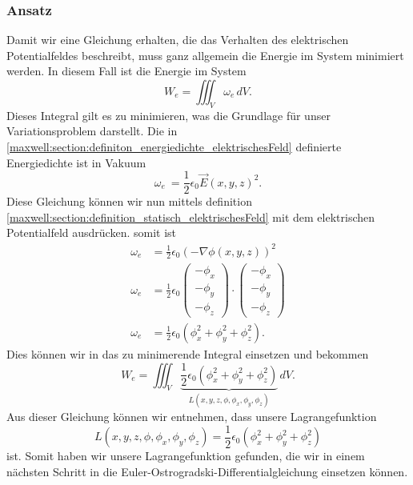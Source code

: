 \subsubsection{Ansatz}
Damit wir eine Gleichung erhalten, die das Verhalten des elektrischen Potentialfeldes beschreibt, muss ganz allgemein die Energie im System minimiert werden. 
In diesem Fall ist die Energie im System
\[
W_e
=
\iiint_V \omega_e\, dV.
\]
Dieses Integral gilt es zu minimieren, was die Grundlage für unser Variationsproblem darstellt.
Die in \eqref{maxwell:section:definiton_energiedichte_elektrischesFeld} definierte Energiedichte ist in Vakuum
\[
\omega_e\
=
\frac{1}{2}\epsilon_0\vec{E}(x,y,z)^2.
\]
Diese Gleichung können wir nun mittels definition \eqref{maxwell:section:definition_statisch_elektrischesFeld} mit dem elektrischen Potentialfeld ausdrücken.
somit ist
\begin{align}
\omega_e
&=
\frac{1}{2}\epsilon_0\left(-\nabla\phi(x,y,z)\right)^2
\\
\omega_e
&=
\frac{1}{2}\epsilon_0
\begin{pmatrix}
-\phi_x\\
-\phi_y\\
-\phi_z
\end{pmatrix}
\cdot
\begin{pmatrix}
-\phi_x\\
-\phi_y\\
-\phi_z
\end{pmatrix}
\\
\omega_e
&=
\frac{1}{2}\epsilon_0\left(\phi_x^2 + \phi_y^2 + \phi_z^2\right).
\label{maxwell:section:energiedichte}
\end{align}
Dies können wir in das zu minimerende Integral einsetzen und bekommen
\begin{equation}
	W_e
	=
	\iiint_V \underbrace{
		\frac{1}{2}\epsilon_0\left(\phi_x^2 + \phi_y^2 + \phi_z^2\right)}_{L(x,y,z,\phi,\phi_x,\phi_y,\phi_z)}\, dV.
	\label{maxwell:section:energieintegral_quellenfrei}
\end{equation}
Aus dieser Gleichung können wir entnehmen, dass unsere Lagrangefunktion
\begin{equation}
	L(x,y,z,\phi,\phi_x,\phi_y,\phi_z)
	=
	\frac{1}{2}\epsilon_0\left(\phi_x^2 + \phi_y^2 + \phi_z^2\right)
	\label{maxwell:section:lagrangefunktion_quellenfrei}
\end{equation}
ist.
Somit haben wir unsere Lagrangefunktion gefunden, die wir in einem nächsten Schritt in die Euler-Ostrogradski-Differentialgleichung einsetzen können.

